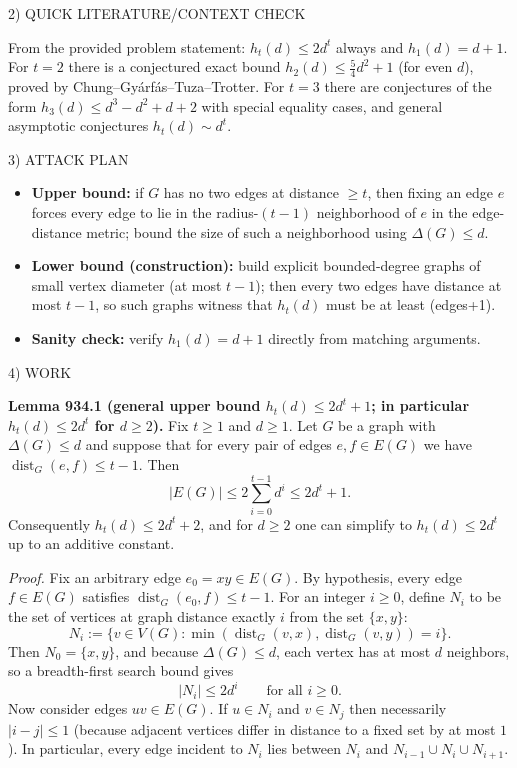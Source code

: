 2) QUICK LITERATURE/CONTEXT CHECK

From the provided problem statement: $h_t(d)\le 2d^t$ always and $h_1(d)=d+1$.
For $t=2$ there is a conjectured exact bound $h_2(d)\le \tfrac54 d^2+1$ (for even $d$), proved by Chung--Gy\'arf\'as--Tuza--Trotter.
For $t=3$ there are conjectures of the form $h_3(d)\le d^3-d^2+d+2$ with special equality cases, and general asymptotic conjectures $h_t(d)\sim d^t$.

3) ATTACK PLAN

\begin{itemize}
\item \textbf{Upper bound:} if $G$ has no two edges at distance $\ge t$, then fixing an edge $e$ forces every edge to lie in the radius-$(t-1)$ neighborhood of $e$ in the edge-distance metric; bound the size of such a neighborhood using $\Delta(G)\le d$.
\item \textbf{Lower bound (construction):} build explicit bounded-degree graphs of small vertex diameter (at most $t-1$); then every two edges have distance at most $t-1$, so such graphs witness that $h_t(d)$ must be at least (edges+1).
\item \textbf{Sanity check:} verify $h_1(d)=d+1$ directly from matching arguments.
\end{itemize}

4) WORK

\textbf{Lemma 934.1 (general upper bound $h_t(d)\le 2d^t+1$; in particular $h_t(d)\le 2d^t$ for $d\ge 2$).}
Fix $t\ge 1$ and $d\ge 1$.
Let $G$ be a graph with $\Delta(G)\le d$ and suppose that for every pair of edges $e,f\in E(G)$ we have $\operatorname{dist}_G(e,f)\le t-1$.
Then
\[
|E(G)|\le 2\sum_{i=0}^{t-1} d^{i} \le 2d^t+1.
\]
Consequently $h_t(d)\le 2d^t+2$, and for $d\ge 2$ one can simplify to $h_t(d)\le 2d^t$ up to an additive constant.

\emph{Proof.}
Fix an arbitrary edge $e_0=xy\in E(G)$. By hypothesis, every edge $f\in E(G)$ satisfies $\operatorname{dist}_G(e_0,f)\le t-1$.
For an integer $i\ge 0$, define $N_i$ to be the set of vertices at graph distance exactly $i$ from the set $\{x,y\}$:
\[
N_i:=\{v\in V(G): \min(\operatorname{dist}_G(v,x),\operatorname{dist}_G(v,y))=i\}.
\]
Then $N_0=\{x,y\}$, and because $\Delta(G)\le d$, each vertex has at most $d$ neighbors, so a breadth-first search bound gives
\[
|N_i|\le 2d^i\qquad\text{for all }i\ge 0.
\]
Now consider edges $uv\in E(G)$.
If $u\in N_i$ and $v\in N_j$ then necessarily $|i-j|\le 1$ (because adjacent vertices differ in distance to a fixed set by at most $1$). In particular, every edge incident to $N_i$ lies between $N_i$ and $N_{i-1}\cup N_i\cup N_{i+1}$.

